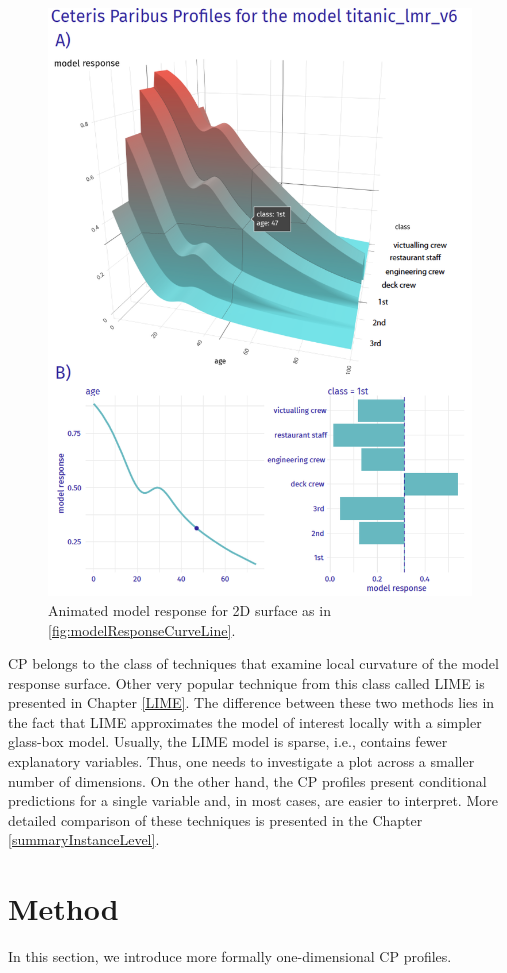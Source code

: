 \documentclass[]{krantz}
\begin{document}
\begin{figure}

{\centering \includegraphics[width=0.6\linewidth]{figure/profile_age_class} 

}

\caption{Animated model response for 2D surface as in \ref{fig:modelResponseCurveLine}.}\label{fig:modelResponseCurveAnimation}
\end{figure}

CP belongs to the class of techniques that examine local curvature of the model response surface. Other very popular technique from this class called LIME is presented in Chapter \ref{LIME}.
The difference between these two methods lies in the fact that LIME approximates the model of interest locally with a simpler glass-box model. Usually, the LIME model is sparse, i.e., contains fewer explanatory variables. Thus, one needs to investigate a plot across a smaller number of dimensions. On the other hand, the CP profiles present conditional predictions for a single variable and, in most cases, are easier to interpret. More detailed comparison of these techniques is presented in the Chapter \ref{summaryInstanceLevel}.

\hypertarget{CPMethod}{%
\section{Method}\label{CPMethod}}

In this section, we introduce more formally one-dimensional CP profiles.
\end{document}
